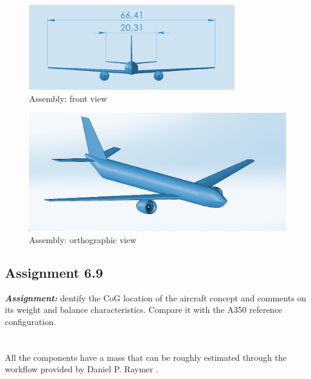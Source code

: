 \documentclass{article}
\begin{document}
\begin{figure}[h!]
    \centering
    \includegraphics[width=0.8\textwidth]{Sources/Plots_and_Pictures/Assembly_front.png}
    \caption{Assembly: front view}
    \label{Assembly_front}
\end{figure}

\begin{figure}[h!]
    \centering
    \includegraphics[width=\textwidth]{Sources/Plots_and_Pictures/Assembly_ortho.png}
    \caption{Assembly: orthographic view}
    \label{Assembly_ortho}
\end{figure}

\clearpage

\subsection{Assignment 6.9\label{Assignment_6.9}}

\textbf{\textit{Assignment:}} dentify the CoG location of the aircraft concept and comments
on its weight and balance characteristics. 
Compare it with the A350 reference configuration. \\ \\ \\ 

All the components have a mass that can be roughly estimated through the workflow provided 
by Daniel P. Raymer \autocite{Raymer_Daniel}. \\ 
\end{document}
